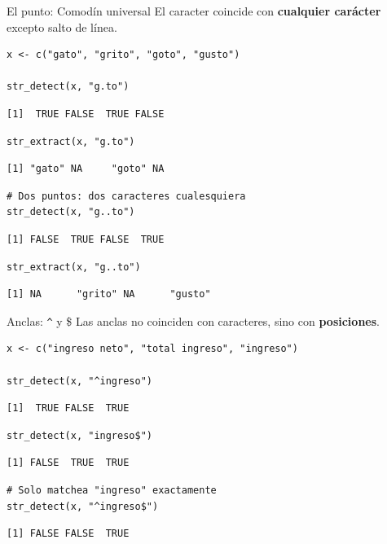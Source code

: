 \documentclass[8pt]{beamer}
\begin{document}
\begin{frame}[fragile]{El punto: Comodín universal}
	El caracter  coincide con \textbf{cualquier carácter} excepto salto de línea.
\begin{lstlisting}[style=RScript]
x <- c("gato", "grito", "goto", "gusto")

str_detect(x, "g.to")
\end{lstlisting}
\begin{lstlisting}[style=RConsole]
[1]  TRUE FALSE  TRUE FALSE
\end{lstlisting}
\begin{lstlisting}[style=RScript]
str_extract(x, "g.to")
\end{lstlisting}
\begin{lstlisting}[style=RConsole]
[1] "gato" NA     "goto" NA
\end{lstlisting}
\begin{lstlisting}[style=RScript]
# Dos puntos: dos caracteres cualesquiera
str_detect(x, "g..to")
\end{lstlisting}
\begin{lstlisting}[style=RConsole]
[1] FALSE  TRUE FALSE  TRUE
\end{lstlisting}
\begin{lstlisting}[style=RScript]
str_extract(x, "g..to")
\end{lstlisting}
\begin{lstlisting}[style=RConsole]
[1] NA      "grito" NA      "gusto"
\end{lstlisting}
\end{frame}




\begin{frame}[fragile]{Anclas: \texttt{\textasciicircum{}} y \$}
	Las anclas no coinciden con caracteres, sino con \textbf{posiciones}.
	
\begin{lstlisting}[style=RScript]
x <- c("ingreso neto", "total ingreso", "ingreso")

str_detect(x, "^ingreso")
\end{lstlisting}
\begin{lstlisting}[style=RConsole]
[1]  TRUE FALSE  TRUE
\end{lstlisting}

\begin{lstlisting}[style=RScript]
str_detect(x, "ingreso$")
\end{lstlisting}
\begin{lstlisting}[style=RConsole]
[1] FALSE  TRUE  TRUE
\end{lstlisting}

\begin{lstlisting}[style=RScript]
# Solo matchea "ingreso" exactamente
str_detect(x, "^ingreso$")
\end{lstlisting}
\begin{lstlisting}[style=RConsole]
[1] FALSE FALSE  TRUE
\end{lstlisting}
\end{frame}
\end{document}
